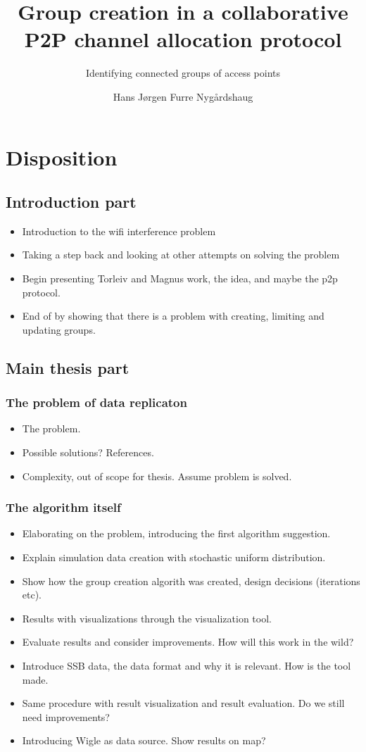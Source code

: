 \documentclass[a4paper,UKenglish]{report}
\title{Group creation in a collaborative P2P channel allocation protocol}
\subtitle{Identifying connected groups of access points}
\author{Hans Jørgen Furre Nygårdshaug}
\begin{document}
\duoforside[dept={Institutt for informatikk},
  program={Informatikk: programmering og nettverk},
  long]

\chapter{Disposition} 
\section {Introduction part}
\begin{itemize} 
	\item Introduction to the wifi interference problem
	\item Taking a step back and looking at other attempts on solving the problem
	\item Begin presenting Torleiv and Magnus work, the idea, and maybe the p2p protocol.
	\item End of by showing that there is a problem with creating, limiting and updating groups.
\end{itemize}

\section {Main thesis part}
\subsection{The problem of data replicaton} 
\begin{itemize} 
	\item The problem.
	\item Possible solutions? References.
	\item Complexity, out of scope for thesis. Assume problem is solved.
\end{itemize} 
\subsection{The algorithm itself} 
\begin{itemize} 
	\item Elaborating on the problem, introducing the first algorithm suggestion.
	\item Explain simulation data creation with stochastic uniform distribution.
	\item Show how the group creation algorith was created, design decisions (iterations etc).
	\item Results with visualizations through the visualization tool. 
	\item Evaluate results and consider improvements. How will this work in the wild?
	\item Introduce SSB data, the data format and why it is relevant. How is the tool made.
	\item Same procedure with result visualization and result evaluation. Do we still need improvements?
	\item Introducing Wigle as data source. Show results on map?
\end{itemize}
\end{document}
